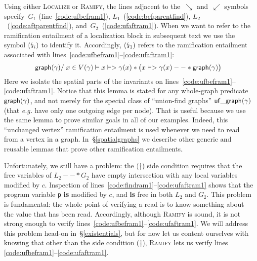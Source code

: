Using either \textsc{Localize} or \textsc{Ramify}, the lines adjacent to the~$\searrow$ and~$\swarrow$ symbols specify~$G_1$ (line~\ref{code:ufbefram1}), $L_1$~(\ref{code:befparentfind}),
$L_2$~(\ref{code:aftparentfind}), and~$G_2$~(\ref{code:ufaftram1}). 
When we want to refer to the ramification entailment of a localization block in subsequent text we use the symbol $(\mbox{\lightning}_i)$ to identify it.  Accordingly, $(\mbox{\lightning}_1)$ refers to the ramification entailment associated with lines~\ref{code:ufbefram1}--\ref{code:ufaftram1}:
\[
\mathsf{graph}(\gamma) /| x \in V(\gamma) |- x |-> \gamma(x) * \big(x |-> \gamma(x) --* \mathsf{graph}(\gamma)\big)
\]
Here we isolate the spatial parts of the invariants on lines~\ref{code:ufbefram1}--\ref{code:ufaftram1}.  Notice that this lemma is stated for any whole-graph predicate $\mathsf{graph}(\gamma)$, and not merely for the special class of ``union-find graphs'' $\mathsf{uf\_graph}(\gamma)$ (that \emph{e.g.} have only one outgoing edge per node).  That is useful because we use the same lemma to prove similar goals in all of our examples.
Indeed, this ``unchanged vertex'' ramification entailment is used whenever we need to read from a vertex in a graph.  In~\S\ref{spatialgraphs} we describe other generic and reusable lemmas that prove other ramification entailments.

Unfortunately, we still have a problem: the ($\ddagger$) side condition requires that the free variables of $L_2 --* G_2$ have empty intersection with any local variables modified by $c$.  Inspection of lines~\ref{code:findram1}--\ref{code:ufaftram1} shows that the program variable \texttt{p} \textbf{is} modified by $c$, and \textbf{is} free in both $L_2$ and $G_2$.  This problem is fundamental: the whole point of verifying a read is to know something about the value that has been read.  Accordingly, although \textsc{Ramify} is sound, it is not strong enough to verify
lines~\ref{code:ufbefram1}--\ref{code:ufaftram1}.  We will address this problem head-on in~\S\ref{existentials}, but for now let us content ourselves with knowing that other than the side condition ($\ddagger$), \textsc{Ramify} lets us verify lines \ref{code:ufbefram1}--\ref{code:ufaftram1}.

